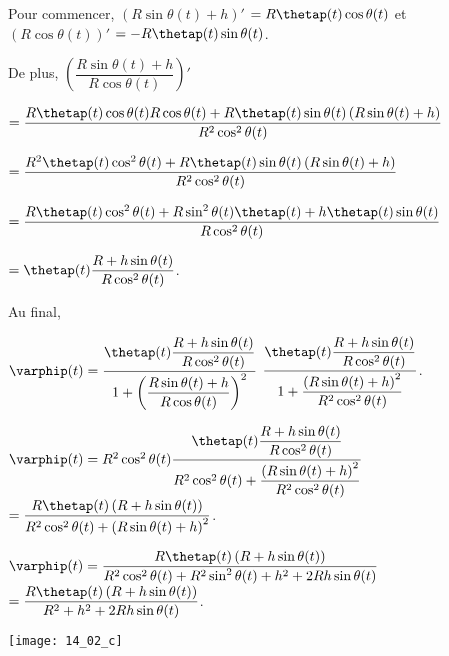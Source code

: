 Pour commencer, $\left( R\sin\theta(t)+h\right)'$ $=R\thetap(t)\cos\theta(t) $
et $\left( R \cos\theta(t)\right)'$ $=- R \thetap(t)\sin\theta(t)$.

De plus, 
$\left( \dfrac{R\sin\theta(t)+h}{R \cos\theta(t)}\right)'$

$ = \dfrac{R\thetap(t)\cos\theta(t) R \cos\theta(t) + R \thetap(t)\sin\theta(t) \left( R\sin\theta(t)+h\right) }{ R^2 \cos^2\theta(t)}$

$ = \dfrac{R^2\thetap(t)\cos^2\theta(t)  + R \thetap(t)\sin\theta(t) \left( R\sin\theta(t)+h\right) }{ R^2 \cos^2\theta(t)}$


$ = \dfrac{R\thetap(t)\cos^2\theta(t)  +   R\sin^2\theta(t)\thetap(t)+h\thetap(t)\sin\theta(t)}{ R \cos^2\theta(t)}$

$ = \thetap(t)\dfrac{R+h\sin\theta(t)}{ R \cos^2\theta(t)}$.


Au final, 

$ \varphip(t) =  \dfrac{\thetap(t)\dfrac{R+h\sin\theta(t)}{ R \cos^2\theta(t)}}{1+\left( \dfrac{R\sin\theta(t)+h}{R \cos\theta(t)}\right)^2}$
$   \dfrac{\thetap(t)\dfrac{R+h\sin\theta(t)}{ R \cos^2\theta(t)}}{1+ \dfrac{\left(R\sin\theta(t)+h\right)^2}{R^2 \cos^2\theta(t)}}$.

$ \varphip(t) =  R^2 \cos^2\theta(t) \dfrac{\thetap(t)\dfrac{R+h\sin\theta(t)}{ R \cos^2\theta(t)}}{R^2 \cos^2\theta(t)+ \dfrac{\left(R\sin\theta(t)+h\right)^2}{R^2 \cos^2\theta(t)}}$
$ =  \dfrac{R \thetap(t)\left(R+h\sin\theta(t)\right)}{R^2 \cos^2\theta(t)+ \left(R\sin\theta(t)+h\right)^2}$.

$ \varphip(t) =  \dfrac{R \thetap(t)\left(R+h\sin\theta(t)\right)}{R^2 \cos^2\theta(t)+ R^2\sin^2\theta(t)+h^2+2 Rh\sin\theta(t)}$
$ =  \dfrac{R \thetap(t)\left(R+h\sin\theta(t)\right)}{R^2+h^2+2 Rh\sin\theta(t)}$.

\else
\fi

\ifprof

\begin{marginfigure}
\texttt{[image: 14\_02\_c]}
\end{marginfigure}

